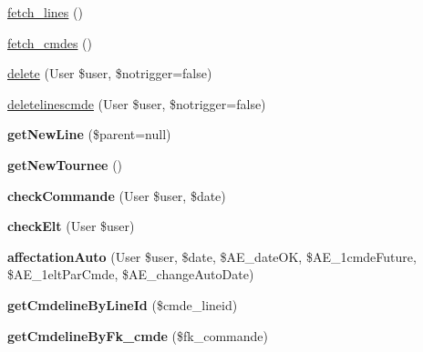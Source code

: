 \begin{DoxyCompactItemize}
\item 
\hyperlink{classTourneeUnique__lines_a0614c81d6e4ade3d2e1ee9d61cc87cf4}{fetch\+\_\+lines} ()
\item 
\hyperlink{classTourneeUnique__lines_a6891887c52ee8db06808f1e8d25b01f4}{fetch\+\_\+cmdes} ()
\item 
\hyperlink{classTourneeUnique__lines_ad0a9095e6cc9fbeb404fbc9ff283c464}{delete} (User \$user, \$notrigger=false)
\item 
\hyperlink{classTourneeUnique__lines_a97bf251efe7d4bb5f6fe020749e30d21}{deletelinescmde} (User \$user, \$notrigger=false)
\item 
\mbox{\label{classTourneeUnique__lines_a771ce3ae1f1380e133c0e87b79e828d5}} 
{\bfseries get\+New\+Line} (\$parent=null)
\item 
\mbox{\label{classTourneeUnique__lines_a3a1654b5f39c5cb7f887039fe5fb0a55}} 
{\bfseries get\+New\+Tournee} ()
\item 
\mbox{\label{classTourneeUnique__lines_a72600f0e0aed1a124789942a4e58f6a8}} 
{\bfseries check\+Commande} (User \$user, \$date)
\item 
\mbox{\label{classTourneeUnique__lines_a2b67b7a9a5d5586c38066702b92b134a}} 
{\bfseries check\+Elt} (User \$user)
\item 
\mbox{\label{classTourneeUnique__lines_a9b379183106e3994d0ad8406504d5cab}} 
{\bfseries affectation\+Auto} (User \$user, \$date, \$A\+E\+\_\+date\+OK, \$A\+E\+\_\+1cmde\+Future, \$A\+E\+\_\+1elt\+Par\+Cmde, \$A\+E\+\_\+change\+Auto\+Date)
\item 
\mbox{\label{classTourneeUnique__lines_acd83ac2710d5765cfcfb7ceba3b304a8}} 
{\bfseries get\+Cmdeline\+By\+Line\+Id} (\$cmde\+\_\+lineid)
\item 
\mbox{\label{classTourneeUnique__lines_a5dd9077be16c03edec32e221b7b1d44f}} 
{\bfseries get\+Cmdeline\+By\+Fk\+\_\+cmde} (\$fk\+\_\+commande)
\item 
\mbox{\label{classTourneeUnique__lines_a13f722324568b3ddb1fc744544d72c29}} 

\end{DoxyCompactItemize}
